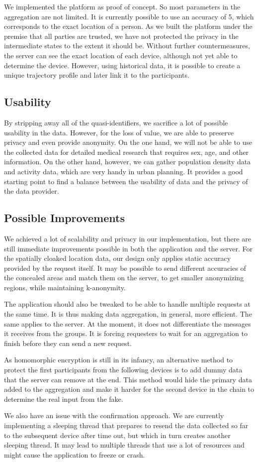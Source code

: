We implemented the platform as proof of concept. So most parameters in the aggregation are not limited. It is currently possible to use an accuracy of 5, which corresponds to the exact location of a person. As we built the platform under the premise that all parties are trusted, we have not protected the privacy in the intermediate states to the extent it should be. Without further countermeasures, the server can see the exact location of each device, although not yet able to determine the device. However, using historical data, it is possible to create a unique trajectory profile and later link it to the participants.

\subsection{Usability}
By stripping away all of the quasi-identifiers, we sacrifice a lot of possible usability in the data. However, for the loss of value, we are able to preserve privacy and even provide anonymity. On the one hand, we will not be able to use the collected data for detailed medical research that requires sex, age, and other information. On the other hand, however, we can gather population density data and activity data, which are very handy in urban planning. It provides a good starting point to find a balance between the usability of data and the privacy of the data provider.

\subsection{Possible Improvements}
We achieved a lot of scalability and privacy in our implementation, but there are still immediate improvements possible in both the application and the server. For the spatially cloaked location data, our design only applies static accuracy provided by the request itself. It may be possible to send different accuracies of the concealed areas and match them on the server, to get smaller anonymizing regions, while maintaining k-anonymity.

The application should also be tweaked to be able to handle multiple requests at the same time. It is thus making data aggregation, in general, more efficient. The same applies to the server. At the moment, it does not differentiate the messages it receives from the groups. It is forcing requesters to wait for an aggregation to finish before they can send a new request.

As homomorphic encryption is still in its infancy, an alternative method to protect the first participants from the following devices is to add dummy data that the server can remove at the end. This method would hide the primary data added to the aggregation and make it harder for the second device in the chain to determine the real input from the fake.

We also have an issue with the confirmation approach. We are currently implementing a sleeping thread that prepares to resend the data collected so far to the subsequent device after time out, but which in turn creates another sleeping thread. It may lead to multiple threads that use a lot of resources and might cause the application to freeze or crash.

